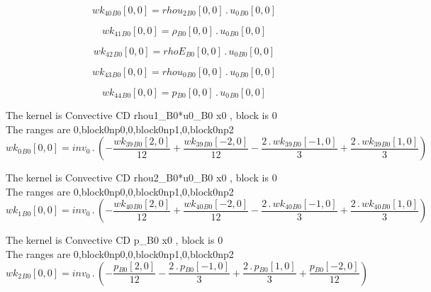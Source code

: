 \documentclass{article}
\begin{document}
\begin{dmath}{wk_{40}{_{B0}}}[{0,0}] = {rhou_{2}{_{B0}}}[{0,0}] \,.\, {u_{0}{_{B0}}}[{0,0}]\end{dmath}

\begin{dmath}{wk_{41}{_{B0}}}[{0,0}] = {\rho{_{B0}}}[{0,0}] \,.\, {u_{0}{_{B0}}}[{0,0}]\end{dmath}

\begin{dmath}{wk_{42}{_{B0}}}[{0,0}] = {rhoE{_{B0}}}[{0,0}] \,.\, {u_{0}{_{B0}}}[{0,0}]\end{dmath}

\begin{dmath}{wk_{43}{_{B0}}}[{0,0}] = {rhou_{0}{_{B0}}}[{0,0}] \,.\, {u_{0}{_{B0}}}[{0,0}]\end{dmath}

\begin{dmath}{wk_{44}{_{B0}}}[{0,0}] = {p{_{B0}}}[{0,0}] \,.\, {u_{0}{_{B0}}}[{0,0}]\end{dmath}

\noindent The kernel is Convective CD rhou1_B0*u0_B0 x0 , block is 0\\\noindent The ranges are 0,block0np0,0,block0np1,0,block0np2\\\begin{dmath}{wk_{0}{_{B0}}}[{0,0}] = inv_0 \,.\, \left(- \frac{{wk_{39}{_{B0}}}[{2,0}]}{12} + \frac{{wk_{39}{_{B0}}}[{-2,0}]}{12} - \frac{2 \,.\, {wk_{39}{_{B0}}}[{-1,0}]}{3} + \frac{2 \,.\, {wk_{39}{_{B0}}}[{1,0}]}{3}\right)\end{dmath}

\noindent The kernel is Convective CD rhou2_B0*u0_B0 x0 , block is 0\\\noindent The ranges are 0,block0np0,0,block0np1,0,block0np2\\\begin{dmath}{wk_{1}{_{B0}}}[{0,0}] = inv_0 \,.\, \left(- \frac{{wk_{40}{_{B0}}}[{2,0}]}{12} + \frac{{wk_{40}{_{B0}}}[{-2,0}]}{12} - \frac{2 \,.\, {wk_{40}{_{B0}}}[{-1,0}]}{3} + \frac{2 \,.\, {wk_{40}{_{B0}}}[{1,0}]}{3}\right)\end{dmath}

\noindent The kernel is Convective CD p_B0 x0 , block is 0\\\noindent The ranges are 0,block0np0,0,block0np1,0,block0np2\\\begin{dmath}{wk_{2}{_{B0}}}[{0,0}] = inv_0 \,.\, \left(- \frac{{p{_{B0}}}[{2,0}]}{12} - \frac{2 \,.\, {p{_{B0}}}[{-1,0}]}{3} + \frac{2 \,.\, {p{_{B0}}}[{1,0}]}{3} + \frac{{p{_{B0}}}[{-2,0}]}{12}\right)\end{dmath}
\end{document}
